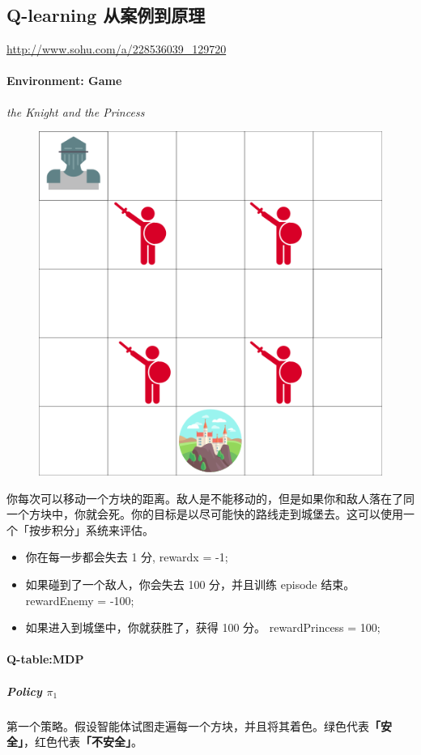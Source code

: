 \documentclass[UTF8,a4paper,12pt]{ctexbook}
\begin{document}
				
				
		\subsection{Q-learning 从案例到原理}	
			\url{http://www.sohu.com/a/228536039_129720}
			
			\paragraph{Environment: Game}
				\textit{the Knight and the Princess}
				
				\begin{figure}[H]
					\centering
					\includegraphics[width=.5\linewidth]{game01}
				\end{figure}
				
				你每次可以移动一个方块的距离。敌人是不能移动的，但是如果你和敌人落在了同一个方块中，你就会死。你的目标是以尽可能快的路线走到城堡去。这可以使用一个「按步积分」系统来评估。
				
				\begin{itemize}
					\item 你在每一步都会失去 1 分, rewardx = -1;
					\item 如果碰到了一个敌人，你会失去 100 分，并且训练 episode 结束。 rewardEnemy = -100;
					\item 如果进入到城堡中，你就获胜了，获得 100 分。 rewardPrincess = 100;
				\end{itemize}
				
				
			\paragraph{Q-table:MDP}
				\subparagraph{Policy $\pi_1$}
					第一个策略。假设智能体试图走遍每一个方块，并且将其着色。绿色代表\textbf{「安全」}，红色代表\textbf{「不安全」}。
					
\end{document}
